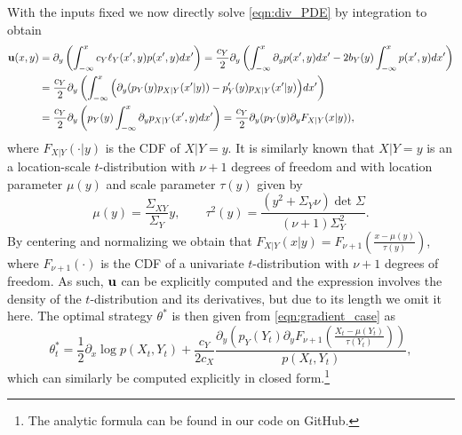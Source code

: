 \documentclass{article}
\theoremstyle{plain}
\theoremstyle{definition}
\numberwithin{lem}{section}
\begin{document}
With the inputs fixed we now directly solve \eqref{eqn:div_PDE}  by integration to obtain
\begin{align}
{\bf u}(x,y) & = \partial_y\left(\int_{-\infty}^x c_Y\ell_Y(x',y)p(x',y)dx'\right) = \frac{c_Y}{2}\partial_y\left(\int_{-\infty}^x \partial_y p(x',y)dx' - 2b_Y(y)\int_{-\infty}^xp(x',y)dx'\right) \\
& = \frac{c_Y}{2}\partial_y\left(\int_{-\infty}^x \Big(\partial_y(p_Y(y)p_{X|Y}(x'|y)) - p_Y'(y)p_{X|Y}(x'|y)\Big)dx'\right) \\ & = \frac{c_Y}{2}\partial_y\left(p_Y(y)\int_{-\infty}^x \partial_y p_{X|Y}(x',y)dx'\right) = \frac{c_Y}{2}\partial_y(p_Y(y)\partial_y F_{X|Y}(x|y)),
\end{align}
where $F_{X|Y}(\cdot|y)$ is the CDF of $X|Y=y$. It is similarly known that $X|Y=y$ is an a location-scale $t$-distribution with $\nu+1$ degrees of freedom and with location parameter $\mu(y)$ and scale parameter $\tau(y)$ given by 
\[\mu(y) = \frac{\Sigma_{XY}}{\Sigma_Y}y, \qquad \tau^2(y) = \frac{( y^2+\Sigma_Y\nu)\det \Sigma}{(\nu + 1)\Sigma_Y^2}. \]
By centering and normalizing we obtain that $F_{X|Y}(x|y) = F_{\nu + 1}(\frac{x-\mu(y)}{\tau(y)})$, where $F_{\nu+1}(\cdot)$ is the CDF of a univariate $t$-distribution with $\nu+1$ degrees of freedom. As such, ${\bf u}$ can be explicitly computed and the expression involves the density of the $t$-distribution and its derivatives, but due to its length we omit it here.
The optimal strategy $\theta^*$ is then given from \eqref{eqn:gradient_case} as
\[\theta^*_t = \frac{1}{2}\partial_x \log p(X_t,Y_t) + \frac{c_Y}{2c_X}\frac{\partial_y \left(p_Y(Y_t)\partial_yF_{\nu+1}(\frac{X_t-\mu(Y_t)}{\tau(Y_t)})\right)}{p(X_t,Y_t)},\]
which can similarly be computed explicitly in closed form.\footnote{The analytic formula can be found in our code on GitHub.}
\end{document}
